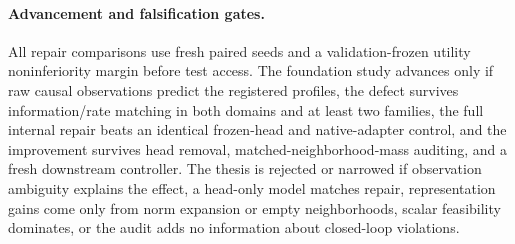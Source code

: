 \paragraph{Advancement and falsification gates.}
All repair comparisons use fresh paired seeds and a validation-frozen utility noninferiority margin
before test access.  The foundation study advances only if raw causal observations predict the
registered profiles, the defect survives information/rate matching in both domains and at least two
families, the full internal repair beats an identical frozen-head and native-adapter control, and
the improvement survives head removal, matched-neighborhood-mass auditing, and a fresh downstream
controller.  The thesis is rejected or narrowed if observation ambiguity explains the effect, a
head-only model matches repair, representation gains come only from norm expansion or empty
neighborhoods, scalar feasibility dominates, or the audit adds no information about closed-loop
violations.
